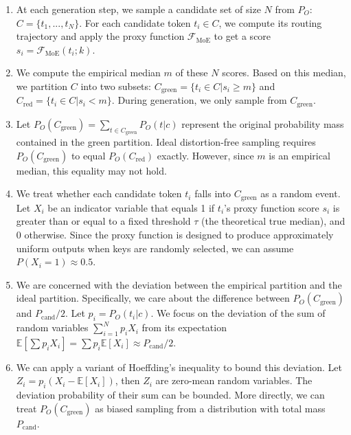 \documentclass[letterpaper,twocolumn,10pt]{article}
\begin{document}
\begin{enumerate}
\item At each generation step, we sample a candidate set of size $N$ from $P_O$: $C = \{t_1,..., t_N\}$. For each candidate token $t_i \in C$, we compute its routing trajectory and apply the proxy function $\mathcal{F}_{\text{MoE}}$ to get a score $s_i = \mathcal{F}_{\text{MoE}}(t_i; k)$.

\item We compute the empirical median $m$ of these $N$ scores. Based on this median, we partition $C$ into two subsets: $C_{\text{green}} = \{t_i \in C | s_i \ge m\}$ and $C_{\text{red}} = \{t_i \in C | s_i < m\}$. During generation, we only sample from $C_{\text{green}}$.

\item Let $P_O(C_{\text{green}}) = \sum_{t \in C_{\text{green}}} P_O(t|c)$ represent the original probability mass contained in the green partition. Ideal distortion-free sampling requires $P_O(C_{\text{green}})$ to equal $P_O(C_{\text{red}})$ exactly. However, since $m$ is an empirical median, this equality may not hold.

\item We treat whether each candidate token $t_i$ falls into $C_{\text{green}}$ as a random event. Let $X_i$ be an indicator variable that equals 1 if $t_i$'s proxy function score $s_i$ is greater than or equal to a fixed threshold $\tau$ (the theoretical true median), and 0 otherwise. Since the proxy function is designed to produce approximately uniform outputs when keys are randomly selected, we can assume $P(X_i=1) \approx 0.5$.

\item We are concerned with the deviation between the empirical partition and the ideal partition. Specifically, we care about the difference between $P_O(C_{\text{green}})$ and $P_{\text{cand}}/2$. Let $p_i = P_O(t_i|c)$. We focus on the deviation of the sum of random variables $\sum_{i=1}^N p_i X_i$ from its expectation $\mathbb{E}[\sum p_i X_i] = \sum p_i \mathbb{E}[X_i] \approx P_{\text{cand}}/2$.

\item We can apply a variant of Hoeffding's inequality to bound this deviation. Let $Z_i = p_i(X_i - \mathbb{E}[X_i])$, then $Z_i$ are zero-mean random variables. The deviation probability of their sum can be bounded. More directly, we can treat $P_O(C_{\text{green}})$ as biased sampling from a distribution with total mass $P_{\text{cand}}$.


\end{enumerate}
\end{document}
